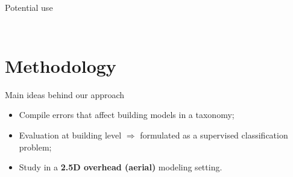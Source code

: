 \documentclass[10pt, export]{beamer}
\begin{document}
\begin{frame}{Potential use}
\begin{minipage}[0.2\textheight]{\textwidth}
\begin{columns}[T]
\begin{column}{0.48\textwidth}
{\begin{figure}
\begin{center}
\begin{subfigure}{.8\textwidth}
                                    \end{subfigure}
                                \end{center}
                            \end{figure}
                        }
                    \end{column}
                \end{columns}
            \end{minipage}
        \end{frame}

    \section{Methodology}
            \begin{frame}{Main ideas behind our approach}
                \begin{itemize}[label=$\blacktriangleright$, font=\color{IGNGreen}, itemsep=2em]
                    \item<1-> Compile errors that affect building models in a taxonomy;
                    \item<2-> Evaluation at building level $\Longrightarrow$ formulated as a supervised classification problem;
                    \item<3-> Study in a \textbf{2.5D overhead (aerial)} modeling setting.
                \end{itemize}
            \end{frame}
\end{document}
